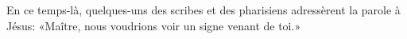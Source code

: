 En ce temps-là, quelques-uns des scribes et des pharisiens
		adressèrent la parole à Jésus:
	«Maître, nous voudrions voir un signe venant de toi.»
